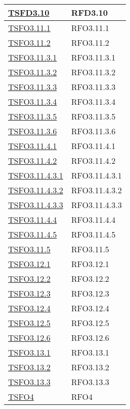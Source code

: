 \begin{longtable}{|>{\centering}m{5cm}|m{5cm}<{\centering}|}
\hyperlink{TSFD3.10}{TSFD3.10} & RFD3.10\\ \hline
\hyperlink{TSFO3.11.1}{TSFO3.11.1} & RFO3.11.1\\ \hline
\hyperlink{TSFO3.11.2}{TSFO3.11.2} & RFO3.11.2\\ \hline
\hyperlink{TSFO3.11.3.1}{TSFO3.11.3.1} & RFO3.11.3.1\\ \hline
\hyperlink{TSFO3.11.3.2}{TSFO3.11.3.2} & RFO3.11.3.2\\ \hline
\hyperlink{TSFO3.11.3.3}{TSFO3.11.3.3} & RFO3.11.3.3\\ \hline
\hyperlink{TSFO3.11.3.4}{TSFO3.11.3.4} & RFO3.11.3.4\\ \hline
\hyperlink{TSFO3.11.3.5}{TSFO3.11.3.5} & RFO3.11.3.5\\ \hline
\hyperlink{TSFO3.11.3.6}{TSFO3.11.3.6} & RFO3.11.3.6\\ \hline
\hyperlink{TSFO3.11.4.1}{TSFO3.11.4.1} & RFO3.11.4.1\\ \hline
\hyperlink{TSFO3.11.4.2}{TSFO3.11.4.2} & RFO3.11.4.2\\ \hline
\hyperlink{TSFO3.11.4.3.1}{TSFO3.11.4.3.1} & RFO3.11.4.3.1\\ \hline
\hyperlink{TSFO3.11.4.3.2}{TSFO3.11.4.3.2} & RFO3.11.4.3.2\\ \hline
\hyperlink{TSFO3.11.4.3.3}{TSFO3.11.4.3.3} & RFO3.11.4.3.3\\ \hline
\hyperlink{TSFO3.11.4.4}{TSFO3.11.4.4} & RFO3.11.4.4\\ \hline
\hyperlink{TSFO3.11.4.5}{TSFO3.11.4.5} & RFO3.11.4.5\\ \hline
\hyperlink{TSFO3.11.5}{TSFO3.11.5} & RFO3.11.5\\ \hline
\hyperlink{TSFO3.12.1}{TSFO3.12.1} & RFO3.12.1\\ \hline
\hyperlink{TSFO3.12.2}{TSFO3.12.2} & RFO3.12.2\\ \hline
\hyperlink{TSFO3.12.3}{TSFO3.12.3} & RFO3.12.3\\ \hline
\hyperlink{TSFO3.12.4}{TSFO3.12.4} & RFO3.12.4\\ \hline
\hyperlink{TSFO3.12.5}{TSFO3.12.5} & RFO3.12.5\\ \hline
\hyperlink{TSFO3.12.6}{TSFO3.12.6} & RFO3.12.6\\ \hline
\hyperlink{TSFO3.13.1}{TSFO3.13.1} & RFO3.13.1\\ \hline
\hyperlink{TSFO3.13.2}{TSFO3.13.2} & RFO3.13.2\\ \hline
\hyperlink{TSFO3.13.3}{TSFO3.13.3} & RFO3.13.3\\ \hline
\hyperlink{TSFO4}{TSFO4} & RFO4\\ \hline

\end{longtable}
